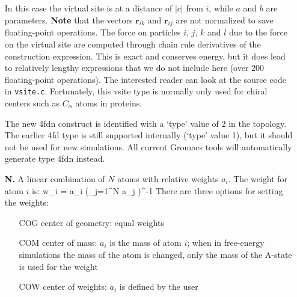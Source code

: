 \begin{itemize}
        In this case the virtual site is at a distance of $|c|$ from $i$, while $a$ and $b$ are 
        parameters. {\bf Note} that the vectors $\mathbf{r}_{ik}$ and $\mathbf{r}_{ij}$ are not normalized
        to save floating-point operations.
        The force on particles $i$, $j$, $k$ and $l$ due to the force 
        on the virtual site are computed through chain rule derivatives
        of the construction expression. This is exact and conserves energy,
        but it does lead to relatively lengthy expressions that we do not
        include here (over 200 floating-point operations). The interested reader can 
        look at the source code in \verb+vsite.c+. Fortunately, this vsite type is normally
        only used for chiral centers such as $C_{\alpha}$ atoms in proteins.
      
The new 4fdn construct is identified with a `type' value of 2 in the topology. The earlier 4fd
type is still supported internally (`type' value 1), but it should not be used for
new simulations. All current Gromacs tools will automatically generate type 4fdn instead.


\item[{\bf\sf N.}]\label{subsec:vsiteN} A linear combination of $N$ atoms with relative
weights $a_i$. The weight for atom $i$ is:
\beq
  w_i = a_i \left(\sum_{j=1}^N a_j \right)^{-1}
\eeq
There are three options for setting the weights:
\begin{itemize}
\item[COG] center of geometry: equal weights
\item[COM] center of mass: $a_i$ is the mass of atom $i$;
when in free-energy simulations the mass of the atom is changed,
only the mass of the A-state is used for the weight
\item[COW] center of weights: $a_i$ is defined by the user
\end{itemize}

\end{itemize}

\newcommand{\dr}{{\rm d}r}
\newcommand{\avcsix}{\left< C_6 \right>}

